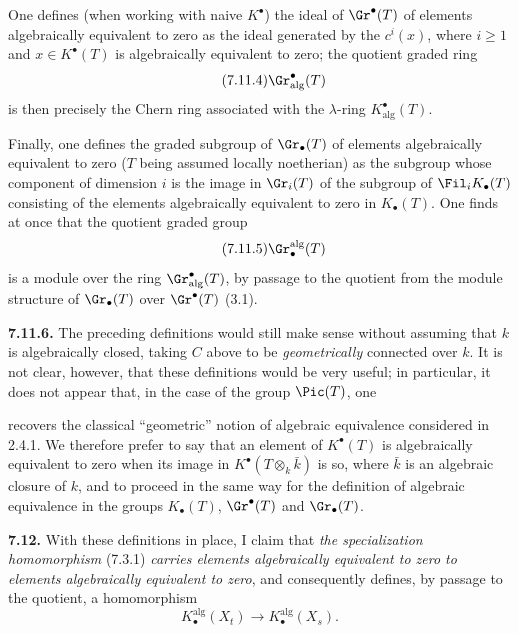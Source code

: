 One defines (when working with naive \(K^\bullet\)) the ideal of \(\Gr^\bullet(T)\) of elements algebraically equivalent to zero as the ideal generated by the \(c^i(x)\), where \(i\geq1\) and \(x\in K^\bullet(T)\) is algebraically equivalent to zero; the quotient graded ring
\begin{equation}\tag{7.11.4}
  \Gr^\bullet_{\mathrm{alg}}(T)
\end{equation}
is then precisely the Chern ring associated with the \(\lambda\)-ring \(K^\bullet_{\mathrm{alg}}(T)\).

Finally, one defines the graded subgroup of \(\Gr_\bullet(T)\) of elements algebraically equivalent to zero (\(T\) being assumed locally noetherian) as the subgroup whose component of dimension \(i\) is the image in \(\Gr_i(T)\) of the subgroup of \(\Fil_iK_\bullet(T)\) consisting of the elements algebraically equivalent to zero in \(K_\bullet(T)\). One finds at once that the quotient graded group
\begin{equation}\tag{7.11.5}
  \Gr_\bullet^{\mathrm{alg}}(T)
\end{equation}
is a module over the ring \(\Gr^\bullet_{\mathrm{alg}}(T)\), by passage to the quotient from the module structure of \(\Gr_\bullet(T)\) over \(\Gr^\bullet(T)\) (3.1).

\textbf{7.11.6.} The preceding definitions would still make sense without assuming that \(k\) is algebraically closed, taking \(C\) above to be \emph{geometrically} connected over \(k\). It is not clear, however, that these definitions would be very useful; in particular, it does not appear that, in the case of the group \(\Pic(T)\), one

%

recovers the classical ``geometric'' notion of algebraic equivalence considered in 2.4.1. We therefore prefer to say that an element of \(K^\bullet(T)\) is algebraically equivalent to zero when its image in \(K^\bullet(T\otimes_k\bar k)\) is so, where \(\bar k\) is an algebraic closure of \(k\), and to proceed in the same way for the definition of algebraic equivalence in the groups \(K_\bullet(T)\), \(\Gr^\bullet(T)\) and \(\Gr_\bullet(T)\).

\textbf{7.12.} With these definitions in place, I claim that \emph{the specialization homomorphism} (7.3.1) \emph{carries elements algebraically equivalent to zero to elements algebraically equivalent to zero}, and consequently defines, by passage to the quotient, a homomorphism
\begin{equation}\tag{7.12.1}
  K_\bullet^{\mathrm{alg}}(X_t)\longrightarrow K_\bullet^{\mathrm{alg}}(X_s).
\end{equation}

